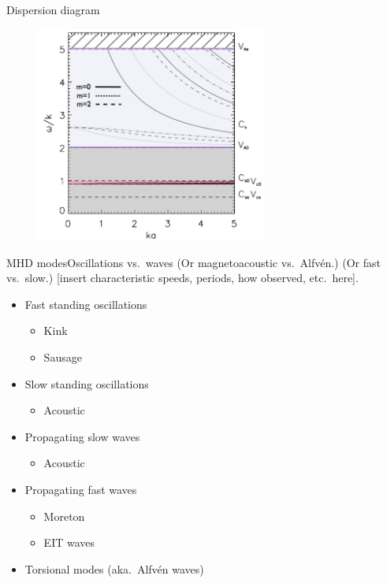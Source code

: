 \documentclass[table]{beamer}
\begin{document}
\begin{frame}{Dispersion diagram}
    \begin{figure}
        \includegraphics[width=3in]{disp_diagram.png}
    \end{figure}
\end{frame}%
\begin{frame}{MHD modes}{Oscillations vs.\ waves}
    (Or magnetoacoustic vs.\ Alfv\'en.)
    (Or fast vs.\ slow.)
    [insert characteristic speeds, periods, how observed, etc.\ here].
    \begin{itemize}
        \item Fast standing oscillations
            \begin{itemize}
                \item Kink
                \item Sausage
            \end{itemize}
        \item Slow standing oscillations
            \begin{itemize}
                \item Acoustic
            \end{itemize}
        \item Propagating slow waves
            \begin{itemize}
                \item Acoustic
            \end{itemize}
        \item Propagating fast waves
            \begin{itemize}
                \item Moreton
                \item EIT waves
            \end{itemize}
        \item Torsional modes (aka.\ Alfv\'en waves)
    \end{itemize}
\end{frame}%
\end{document}
